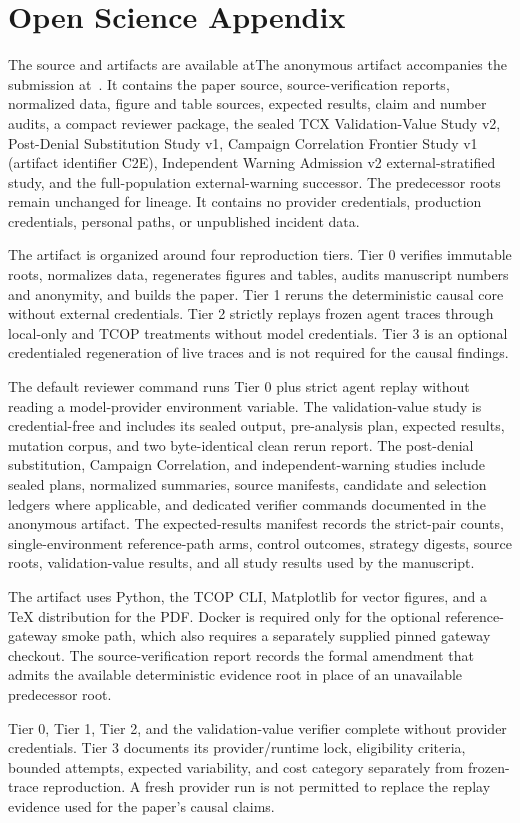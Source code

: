 \section{Open Science Appendix}

\ifdefined\TCOPPreprint The source and artifacts are available at\else The anonymous artifact accompanies the submission at\fi\ \TCOPArtifactLink{}. It contains the paper source, source-verification reports, normalized data, figure and table sources, expected results, claim and number audits, a compact reviewer package, the sealed TCX Validation-Value Study v2, Post-Denial Substitution Study v1, Campaign Correlation Frontier Study v1 (artifact identifier C2E), Independent Warning Admission v2 external-stratified study, and the full-population external-warning successor. The predecessor roots remain unchanged for lineage. It contains no provider credentials, production credentials, personal paths, or unpublished incident data.

The artifact is organized around four reproduction tiers. Tier 0 verifies immutable roots, normalizes data, regenerates figures and tables, audits manuscript numbers and anonymity, and builds the paper. Tier 1 reruns the deterministic causal core without external credentials. Tier 2 strictly replays frozen agent traces through local-only and TCOP treatments without model credentials. Tier 3 is an optional credentialed regeneration of live traces and is not required for the causal findings.

The default reviewer command runs Tier 0 plus strict agent replay without reading a model-provider environment variable. The validation-value study is credential-free and includes its sealed output, pre-analysis plan, expected results, mutation corpus, and two byte-identical clean rerun report. The post-denial substitution, Campaign Correlation, and independent-warning studies include sealed plans, normalized summaries, source manifests, candidate and selection ledgers where applicable, and dedicated verifier commands documented in the anonymous artifact. The expected-results manifest records the strict-pair counts, single-environment reference-path arms, control outcomes, strategy digests, source roots, validation-value results, and all study results used by the manuscript.

The artifact uses Python, the TCOP CLI, Matplotlib for vector figures, and a TeX distribution for the PDF. Docker is required only for the optional reference-gateway smoke path, which also requires a separately supplied pinned gateway checkout. The source-verification report records the formal amendment that admits the available deterministic evidence root in place of an unavailable predecessor root.

Tier 0, Tier 1, Tier 2, and the validation-value verifier complete without provider credentials. Tier 3 documents its provider/runtime lock, eligibility criteria, bounded attempts, expected variability, and cost category separately from frozen-trace reproduction. A fresh provider run is not permitted to replace the replay evidence used for the paper's causal claims.
